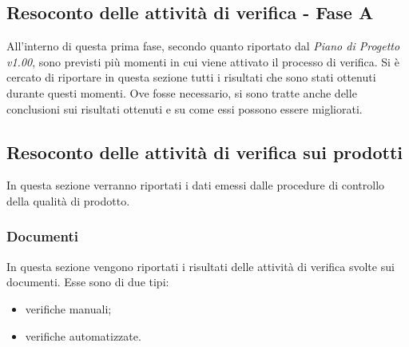 \documentclass[../PianoDiQualifica.tex]{subfiles}
\begin{document}
\begin{appendices}
\section{Resoconto delle attività di verifica - Fase A}
All'interno di questa prima fase, secondo quanto riportato dal \textit{Piano di Progetto v1.00}, sono previsti più momenti in cui viene attivato il processo di verifica. Si è cercato di riportare in questa sezione tutti i risultati che sono stati ottenuti durante questi momenti. Ove fosse necessario, si sono tratte anche delle conclusioni sui risultati ottenuti e su come essi possono essere migliorati.
	\subsection{Resoconto delle attività di verifica sui prodotti}
	In questa sezione verranno riportati i dati emessi dalle procedure di controllo della qualità di prodotto.
		\subsubsection{Documenti}
		In questa sezione vengono riportati i risultati delle attività di verifica svolte sui documenti. Esse sono di due tipi:
		\begin{itemize}
			\item verifiche manuali;
			\item verifiche automatizzate.
		\end{itemize}

\end{appendices}
\end{document}
